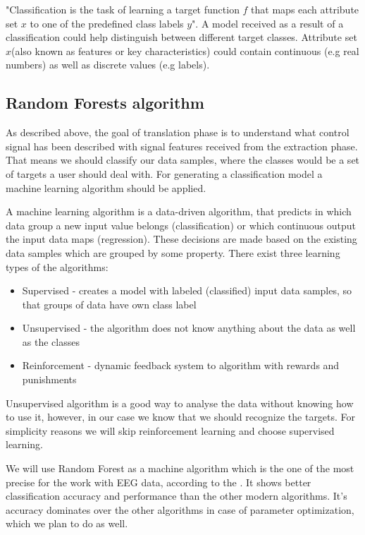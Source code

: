 \documentclass[12pt]{article}
\begin{document}
"Classification is the task of learning a target function $f$ that maps each attribute set $x$ to one of the predefined class labels $y$"\cite{classification_basics}. A model received as a result of a classification could help distinguish between different target classes. Attribute set $x$(also known as features or key characteristics) could contain continuous (e.g real numbers) as well as discrete values (e.g labels).

\subsection{Random Forests algorithm}

As described above, the goal of translation phase is to understand what control signal has been described with signal features received from the extraction phase. That means we should classify our data samples, where the classes would be a set of targets a user should deal with. For generating a classification model a machine learning algorithm should be applied. 

A machine learning algorithm is a data-driven algorithm, that predicts in which data group a new input value belongs (classification) or which continuous output the input data maps (regression). These decisions are made based on the existing data samples which are grouped by some property. There exist three learning types of the algorithms\cite{ml_types}:
\begin{itemize}
\item Supervised - creates a model with labeled (classified) input data samples, so that groups of data have own class label
\item Unsupervised - the algorithm does not know anything about the data as well as the classes
\item Reinforcement - dynamic feedback system to algorithm with rewards and punishments
\end{itemize}
Unsupervised algorithm is a good way to analyse the data without knowing how to use it, however, in our case we know that we should recognize the targets. For simplicity reasons we will skip reinforcement learning and choose supervised learning.

We will use Random Forest as a machine algorithm which is the one of the most precise for the work with EEG data, according to the \cite{masso}. It shows better classification accuracy and performance than the other modern algorithms. It's accuracy dominates over the other algorithms in case of parameter optimization, which we plan to do as well. 
\end{document}
